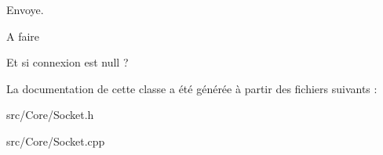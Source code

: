 Envoye. 

\begin{DoxyRefDesc}{A faire}
\item[\hyperlink{todo__todo000011}{A faire}]Et si connexion est null ? \end{DoxyRefDesc}


La documentation de cette classe a été générée à partir des fichiers suivants \-:\begin{DoxyCompactItemize}
\item 
src/\-Core/Socket.\-h\item 
src/\-Core/Socket.\-cpp\end{DoxyCompactItemize}
